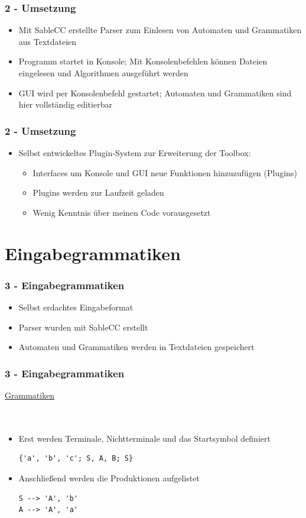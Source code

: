 \documentclass[9pt, xcolor={dvipsnames}]{beamer}
\begin{document}
\begin{frame}\frametitle{2 - Umsetzung}
	\begin{itemize}
		\item Mit SableCC erstellte Parser zum Einlesen von Automaten und Grammatiken aus Textdateien
		\item Programm startet in Konsole; Mit Konsolenbefehlen können Dateien eingelesen und Algorithmen ausgeführt werden
		\item GUI wird per Konsolenbefehl gestartet; Automaten und Grammatiken sind hier vollständig editierbar
	\end{itemize}
\end{frame}

\begin{frame}\frametitle{2 - Umsetzung}
	\begin{itemize}
		\item Selbst entwickeltes Plugin-System zur Erweiterung der Toolbox:
		\begin{itemize}
			\item Interfaces um Konsole und GUI neue Funktionen hinzuzufügen (Plugins)
			\item Plugins werden zur Laufzeit geladen
			\item Wenig Kenntnis über meinen Code vorausgesetzt
		\end{itemize}
	\end{itemize}
\end{frame}

\section{Eingabegrammatiken}
\begin{frame}\frametitle{3 - Eingabegrammatiken}
	\begin{itemize}
		\item Selbst erdachtes Eingabeformat
		\item Parser wurden mit SableCC erstellt
		\item Automaten und Grammatiken werden in Textdateien gespeichert
	\end{itemize}
\end{frame}

\begin{frame}[fragile]\frametitle{3 - Eingabegrammatiken}
	{ \fontsize{20}{20} \selectfont \underline{Grammatiken}}
	\ \\
	\ \\
	\ \\
	\pause
	\begin{itemize}
		\item Erst werden Terminale, Nichtterminale und das Startsymbol definiert
        \begin{lstlisting}[frame=single]
{'a', 'b', 'c'; S, A, B; S}
        \end{lstlisting}
        \pause
        \item Anschließend werden die Produktionen aufgelistet
        \begin{lstlisting}[frame=single]
S --> 'A', 'b'
A --> 'A', 'a'
        \end{lstlisting}    
	\end{itemize}
\end{frame}
\end{document}
